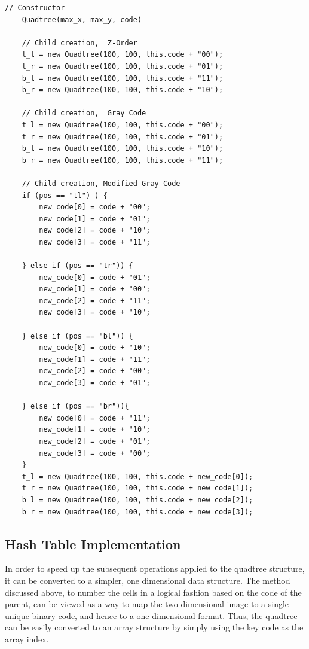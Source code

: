 \begin{lstlisting}[caption={Code to generate children of the current quadtree
while maintaining the correct ordering.},label=code:child_construction]
	// Constructor
	Quadtree(max_x, max_y, code)

	// Child creation,  Z-Order
	t_l = new Quadtree(100, 100, this.code + "00");
	t_r = new Quadtree(100, 100, this.code + "01");
	b_l = new Quadtree(100, 100, this.code + "11");
	b_r = new Quadtree(100, 100, this.code + "10");

	// Child creation,  Gray Code
	t_l = new Quadtree(100, 100, this.code + "00");
	t_r = new Quadtree(100, 100, this.code + "01");
	b_l = new Quadtree(100, 100, this.code + "10");
	b_r = new Quadtree(100, 100, this.code + "11");

	// Child creation, Modified Gray Code
	if (pos == "tl") ) {
		new_code[0] = code + "00";
		new_code[1] = code + "01";
		new_code[2] = code + "10";
		new_code[3] = code + "11";

	} else if (pos == "tr")) {
		new_code[0] = code + "01";
		new_code[1] = code + "00";
		new_code[2] = code + "11";
		new_code[3] = code + "10";

	} else if (pos == "bl")) {
		new_code[0] = code + "10";
		new_code[1] = code + "11";
		new_code[2] = code + "00";
		new_code[3] = code + "01";

	} else if (pos == "br")){
		new_code[0] = code + "11";
		new_code[1] = code + "10";
		new_code[2] = code + "01";
		new_code[3] = code + "00";
	}
	t_l = new Quadtree(100, 100, this.code + new_code[0]);
	t_r = new Quadtree(100, 100, this.code + new_code[1]);
	b_l = new Quadtree(100, 100, this.code + new_code[2]);
	b_r = new Quadtree(100, 100, this.code + new_code[3]);
\end{lstlisting}

\subsection{Hash Table Implementation}
\label{sub:hash_table_implementation}

In order to speed up the subsequent operations applied to the quadtree
structure, it can be converted to a simpler, one dimensional data structure.
The method discussed above, to number the cells in a logical fashion based on
the code of the parent, can be viewed as a way to map the two dimensional image
to a single unique binary code, and hence to a one dimensional format. Thus,
the quadtree can be easily converted to an array structure by simply using the
key code as the array index.

